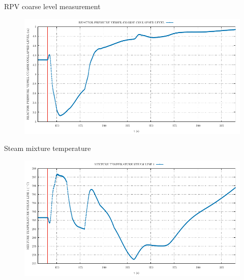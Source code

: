 \begin{frame}{RPV coarse level measurement}
	\begin{figure}
		\centering
		\includegraphics[width=\textwidth]{./graphs/REACTOR PRESSURE VESSEL COARSE COLLAPSED LEVEL_comp.pdf}
		
	\end{figure}
	
\end{frame}

\begin{frame}{Steam mixture temperature}
	\begin{figure}
		\centering
		\includegraphics[width=\textwidth]{./graphs/MIXTURE TEMPERATURE STEAM LINE 1_comp.pdf}
		
	\end{figure}
	
\end{frame}

%		
%	


